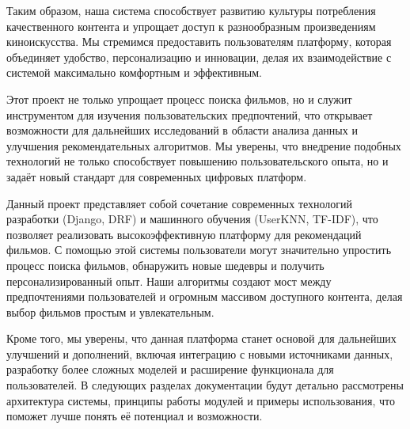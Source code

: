 Таким образом, наша система способствует развитию культуры потребления качественного контента и упрощает доступ к разнообразным произведениям киноискусства. Мы стремимся предоставить пользователям платформу, которая объединяет удобство, персонализацию и инновации, делая их взаимодействие с системой максимально комфортным и эффективным.

Этот проект не только упрощает процесс поиска фильмов, но и служит инструментом для изучения пользовательских предпочтений, что открывает возможности для дальнейших исследований в области анализа данных и улучшения рекомендательных алгоритмов. Мы уверены, что внедрение подобных технологий не только способствует повышению пользовательского опыта, но и задаёт новый стандарт для современных цифровых платформ.

Данный проект представляет собой сочетание современных технологий разработки (Django, DRF) и машинного обучения (UserKNN, TF-IDF), что позволяет реализовать высокоэффективную платформу для рекомендаций фильмов. С помощью этой системы пользователи могут значительно упростить процесс поиска фильмов, обнаружить новые шедевры и получить персонализированный опыт. Наши алгоритмы создают мост между предпочтениями пользователей и огромным массивом доступного контента, делая выбор фильмов простым и увлекательным.

Кроме того, мы уверены, что данная платформа станет основой для дальнейших улучшений и дополнений, включая интеграцию с новыми источниками данных, разработку более сложных моделей и расширение функционала для пользователей. В следующих разделах документации будут детально рассмотрены архитектура системы, принципы работы модулей и примеры использования, что поможет лучше понять её потенциал и возможности.
\endinput

